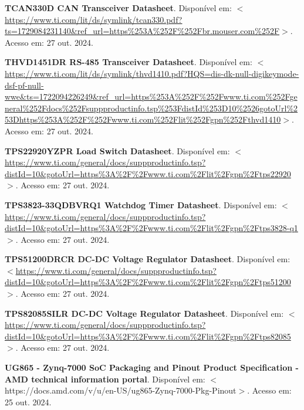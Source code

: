 \begin{flushleft}
\begin{thebibliography}{00}
 \textbf{TCAN330D CAN Transceiver Datasheet}. Disponível em: $<$\url{https://www.ti.com/lit/ds/symlink/tcan330.pdf?ts=1729084231140\&ref\_url=https\%253A\%252F\%252Fbr.mouser.com\%252F}$>$. Acesso em: 27 out. 2024. 

 \textbf{THVD1451DR RS-485 Transceiver Datasheet}. Disponível em: $<$\url{https://www.ti.com/lit/ds/symlink/thvd1410.pdf?HQS=dis-dk-null-digikeymode-dsf-pf-null-wwe\&ts=1722094226249\&ref\_url=https\%253A\%252F\%252Fwww.ti.com\%252Fgeneral\%252Fdocs\%252Fsuppproductinfo.tsp\%253FdistId\%253D10\%2526gotoUrl\%253Dhttps\%253A\%252F\%252Fwww.ti.com\%252Flit\%252Fgpn\%252Fthvd1410}$>$. Acesso em: 27 out. 2024. 

 \textbf{TPS22920YZPR Load Switch Datasheet}. Disponível em: $<$\url{https://www.ti.com/general/docs/suppproductinfo.tsp?distId=10\&gotoUrl=https\%3A\%2F\%2Fwww.ti.com\%2Flit\%2Fgpn\%2Ftps22920}$>$. Acesso em: 27 out. 2024. 

 \textbf{TPS3823-33QDBVRQ1 Watchdog Timer Datasheet}. Disponível em: $<$\url{https://www.ti.com/general/docs/suppproductinfo.tsp?distId=10\&gotoUrl=https\%3A\%2F\%2Fwww.ti.com\%2Flit\%2Fgpn\%2Ftps3828-q1}$>$. Acesso em: 27 out. 2024. 

 \textbf{TPS51200DRCR DC-DC Voltage Regulator Datasheet}. Disponível em: $<$\url{https://www.ti.com/general/docs/suppproductinfo.tsp?distId=10\&gotoUrl=https\%3A\%2F\%2Fwww.ti.com\%2Flit\%2Fgpn\%2Ftps51200}$>$. Acesso em: 27 out. 2024. 

 \textbf{TPS82085SILR DC-DC Voltage Regulator Datasheet}. Disponível em: $<$\url{https://www.ti.com/general/docs/suppproductinfo.tsp?distId=10\&gotoUrl=https\%3A\%2F\%2Fwww.ti.com\%2Flit\%2Fgpn\%2Ftps82085}$>$. Acesso em: 27 out. 2024. 

 \textbf{UG865 - Zynq-7000 SoC Packaging and Pinout Product Specification - AMD technical information portal}. Disponível em: $<$https://docs.amd.com/v/u/en-US/ug865-Zynq-7000-Pkg-Pinout$>$. Acesso em: 25 out. 2024.

\end{thebibliography}
\end{flushleft}

